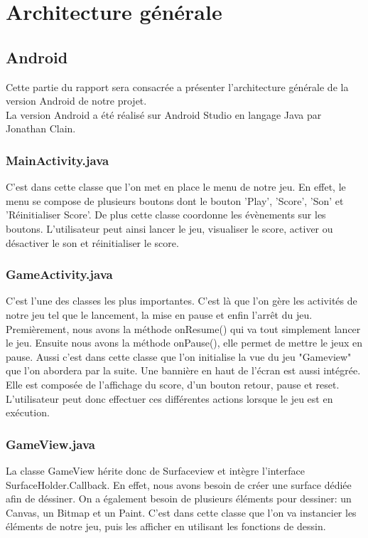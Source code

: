 \documentclass{article}
\begin{document}
\newpage
\section{Architecture générale}
\subsection{Android}
Cette partie du rapport sera consacrée a présenter l'architecture générale de la version Android de notre projet.\\
La version Android a été réalisé sur Android Studio en langage Java par Jonathan Clain.

\subsubsection{MainActivity.java}
C'est dans cette classe que l'on met en place le menu de notre jeu. En effet, le menu se compose de plusieurs boutons dont le bouton 'Play', 'Score', 'Son' et 'Réinitialiser Score'. De plus cette classe coordonne les évènements sur les boutons. L'utilisateur peut ainsi lancer le jeu, visualiser le score, activer ou désactiver le son et réinitialiser le score.

\subsubsection{GameActivity.java}
C'est l'une des classes les plus importantes. C’est là que l’on gère les activités de notre jeu tel que le lancement, la mise en pause et enfin l’arrêt du jeu.
Premièrement, nous avons la méthode onResume() qui va tout simplement lancer le jeu. Ensuite nous avons  la méthode onPause(), elle permet de mettre le jeux en pause.
Aussi c'est dans cette classe que l'on initialise la vue du jeu "Gameview" que l'on abordera par la suite. Une bannière en haut de l'écran est aussi intégrée.
Elle est composée de l'affichage du score, d'un bouton retour, pause et reset. L'utilisateur peut donc effectuer ces différentes actions lorsque le jeu est en exécution. 

\subsubsection{GameView.java}
La classe GameView hérite donc de Surfaceview et intègre l'interface  SurfaceHolder.Callback. En effet, nous avons besoin de créer une surface dédiée afin de déssiner.
On a également besoin de plusieurs éléments pour dessiner: un Canvas, un Bitmap et un Paint.
C'est dans cette classe que l'on va instancier les éléments de notre jeu, puis les afficher en utilisant les fonctions de dessin.
\end{document}
